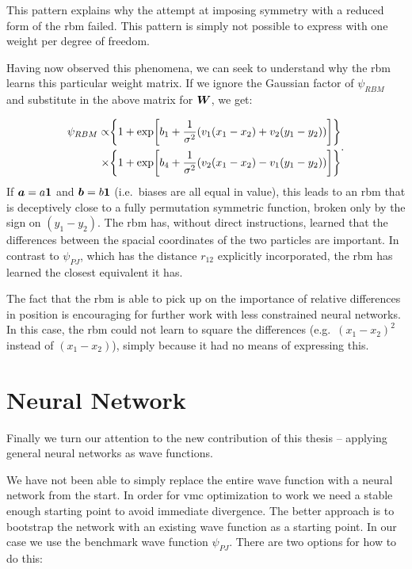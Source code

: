 \documentclass[Thesis.tex]{subfiles}
\begin{document}
This pattern explains why the attempt at imposing symmetry with a reduced form
of the \gls{rbm} failed. This pattern is simply not possible to express with one
weight per degree of freedom.

Having now observed this phenomena, we can seek to understand why the \gls{rbm} learns
this particular weight matrix. If we ignore the Gaussian factor of $\psi_{RBM}$
and substitute in the above matrix for $\bm{W}$, we get:

\begin{align}
  \begin{split}
  \psi_{RBM} \propto &\qty{1 + \exp[b_1 + \frac{1}{\sigma^2}\qty(v_1(x_1-x_2) + v_2(y_1-y_2))]}\\
                   \times &\qty{1 + \exp[b_4 + \frac{1}{\sigma^2}\qty(v_2(x_1-x_2) - v_1(y_1-y_2))]}
  \end{split}.
\end{align}
If $\bm{a}=a\bm{1}$ and $\bm{b}=b\bm{1}$ (i.e.\ biases are all equal in value),
this leads to an \gls{rbm} that is deceptively close to a fully permutation symmetric
function, broken only by the sign on $(y_1-y_2)$. The \gls{rbm} has, without direct
instructions, learned that the differences between the spacial coordinates of
the two particles are important. In contrast to $\psi_{PJ}$, which has the
distance $r_{12}$ explicitly incorporated, the \gls{rbm} has learned the closest
equivalent it has.

The fact that the \gls{rbm} is able to pick up on the importance of relative
differences in position is encouraging for further work with less constrained
neural networks. In this case, the \gls{rbm} could not learn to square the differences
(e.g.\ $(x_1 - x_2)^2$ instead of $(x_1-x_2)$), simply because it had no means
of expressing this.

\section{Neural Network}

Finally we turn our attention to the new contribution of this thesis -- applying
general neural networks as wave functions.

We have not been able to simply replace the entire wave function with a
neural network from the start. In order for \gls{vmc} optimization to work we need a
stable enough starting point to avoid immediate divergence. The better approach
is to bootstrap the network with an existing wave function as a starting point.
In our case we use the benchmark wave function $\psi_{PJ}$. There are two
options for how to do this:
\end{document}
